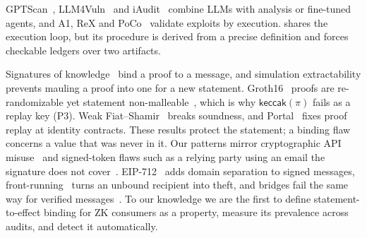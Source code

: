 GPTScan~\cite{gptscan}, LLM4Vuln~\cite{llm4vuln} and iAudit~\cite{iaudit}
combine LLMs with analysis or fine-tuned agents, and A1, ReX and
PoCo~\cite{a1-agent,rex,poco} validate exploits by execution. \tool{} shares
the execution loop, but its procedure is derived from a precise definition
and forces checkable ledgers over two artifacts.

Signatures of knowledge~\cite{sig-of-knowledge,snarky-sigs} bind a proof to a
message, and simulation extractability prevents mauling a proof into one for
a new statement. Groth16~\cite{groth16} proofs are re-randomizable yet
statement non-malleable~\cite{groth16-randomization}, which is why
$\mathsf{keccak}(\pi)$ fails as a replay key (P3). Weak
Fiat--Shamir~\cite{weak-fs} breaks soundness, and Portal~\cite{portal} fixes
proof replay at identity contracts. These results protect the statement; a
binding flaw concerns a value that was never in it. Our patterns mirror
cryptographic API misuse~\cite{egele-crypto-misuse,cryptoguard,crysl,cognicrypt}
and signed-token flaws such as a relying party using an email the signature
does not cover~\cite{sso-flaws}. EIP-712~\cite{eip712} adds domain separation
to signed messages, front-running~\cite{flashboys} turns an unbound recipient
into theft, and bridges fail the same way for verified
messages~\cite{bridge-sok,xscope,smartaxe,interop-sok}. To our knowledge we
are the first to define statement-to-effect binding for ZK consumers as a
property, measure its prevalence across audits, and detect it
automatically.
